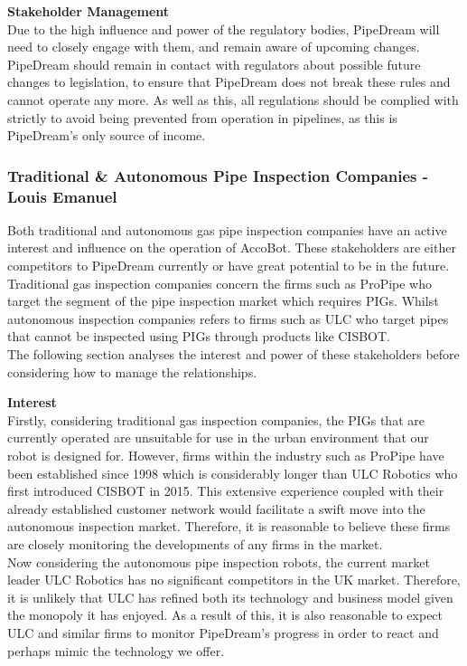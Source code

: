 \documentclass[11pt]{article}		%
\begin{document}
		    \textbf{Stakeholder Management}
		    \\
		    Due to the high influence and power of the regulatory bodies, PipeDream will need to closely engage with them, and remain aware of upcoming changes.
		    PipeDream should remain in contact with regulators about possible future changes to legislation, to ensure that PipeDream does not break these rules and cannot operate any more.
		    As well as this, all regulations should be complied with strictly to avoid being prevented from operation in pipelines, as this is PipeDream's only source of income.
		    
		\subsubsection[Traditional \& Autonomous Pipe Inspection Companies]{Traditional \& Autonomous Pipe Inspection Companies - Louis Emanuel}
		
            Both traditional and autonomous gas pipe inspection companies have an active interest and influence on the operation of AccoBot. These stakeholders are either competitors to PipeDream currently or have great potential to be in the future. Traditional gas inspection companies concern the firms such as ProPipe who target the segment of the pipe inspection market which requires PIGs. Whilst autonomous inspection companies refers to firms such as ULC who target pipes that cannot be inspected using PIGs through products like CISBOT. \\
            \hspace*{3ex}The following section analyses the interest and power of these stakeholders before considering how to manage the relationships.
            
            \textbf{Interest}
            \\
            Firstly, considering traditional gas inspection companies, the PIGs that are currently operated are unsuitable for use in the urban environment that our robot is designed for. However, firms within the industry such as ProPipe have been established since 1998 which is considerably longer than ULC Robotics who first introduced CISBOT in 2015. This extensive experience coupled with their already established customer network would facilitate a swift move into the autonomous inspection market. Therefore, it is reasonable to believe these firms are closely monitoring the developments of any firms in the market.
            \\
            \hspace*{3ex}Now considering the autonomous pipe inspection robots, the current market leader ULC Robotics has no significant competitors in the UK market. Therefore, it is unlikely that ULC has refined both its technology and business model given the monopoly it has enjoyed. As a result of this, it is also reasonable to expect ULC and similar firms to monitor PipeDream's progress in order to react and perhaps mimic the technology we offer. 
            
\end{document}
